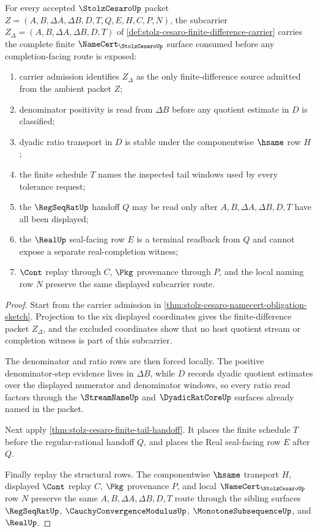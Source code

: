 \begin{theorem}
\label{thm:stolz-cesaro-namecert-obligations}
For every accepted $\StolzCesaroUp$ packet $Z=(A,B,\Delta A,\Delta B,D,T,Q,E,H,C,P,N)$, the subcarrier $Z_{\Delta}=(A,B,\Delta A,\Delta B,D,T)$ of \autoref{def:stolz-cesaro-finite-difference-carrier} carries the complete finite $\NameCert_{\StolzCesaroUp}$ surface consumed before any completion-facing route is exposed:
\begin{enumerate}
\item carrier admission identifies $Z_{\Delta}$ as the only finite-difference source admitted from the ambient packet $Z$;
\item denominator positivity is read from $\Delta B$ before any quotient estimate in $D$ is classified;
\item dyadic ratio transport in $D$ is stable under the componentwise $\hsame$ row $H$;
\item the finite schedule $T$ names the inspected tail windows used by every tolerance request;
\item the $\RegSeqRatUp$ handoff $Q$ may be read only after $A,B,\Delta A,\Delta B,D,T$ have all been displayed;
\item the $\RealUp$ seal-facing row $E$ is a terminal readback from $Q$ and cannot expose a separate real-completion witness;
\item $\Cont$ replay through $C$, $\Pkg$ provenance through $P$, and the local naming row $N$ preserve the same displayed subcarrier route.
\end{enumerate}
\end{theorem}
\begin{proof}
Start from the carrier admission in \autoref{thm:stolz-cesaro-namecert-obligation-sketch}. Projection to the six displayed coordinates gives the finite-difference packet $Z_{\Delta}$, and the excluded coordinates show that no host quotient stream or completion witness is part of this subcarrier.

The denominator and ratio rows are then forced locally. The positive denominator-step evidence lives in $\Delta B$, while $D$ records dyadic quotient estimates over the displayed numerator and denominator windows, so every ratio read factors through the $\StreamNameUp$ and $\DyadicRatCoreUp$ surfaces already named in the packet.

Next apply \autoref{thm:stolz-cesaro-finite-tail-handoff}. It places the finite schedule $T$ before the regular-rational handoff $Q$, and places the Real seal-facing row $E$ after $Q$.

Finally replay the structural rows. The componentwise $\hsame$ transport $H$, displayed $\Cont$ replay $C$, $\Pkg$ provenance $P$, and local $\NameCert_{\StolzCesaroUp}$ row $N$ preserve the same $A,B,\Delta A,\Delta B,D,T$ route through the sibling surfaces $\RegSeqRatUp$, $\CauchyConvergenceModulusUp$, $\MonotoneSubsequenceUp$, and $\RealUp$.
\end{proof}

